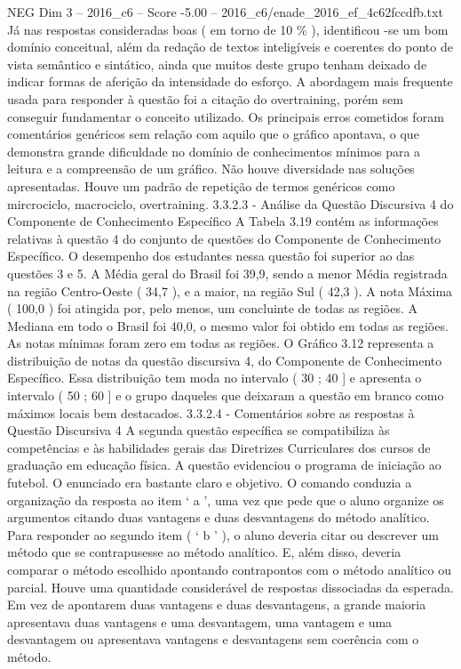 \begin{textsample}{NEG Dim 3 – 2016\_c6 – Score -5.00 – 2016\_c6/enade\_2016\_ef\_4c62fccdfb.txt}
Já nas respostas consideradas boas ( em torno de 10 \% ), identificou -se um bom domínio conceitual, além da redação de textos inteligíveis e coerentes do ponto de vista semântico e sintático, ainda que muitos deste grupo tenham deixado de indicar formas de aferição da intensidade do esforço.
A abordagem mais frequente usada para responder à questão foi a citação do overtraining, porém sem conseguir fundamentar o conceito utilizado.
Os principais erros cometidos foram comentários genéricos sem relação com aquilo que o gráfico apontava, o que demonstra grande dificuldade no domínio de conhecimentos mínimos para a leitura e a compreensão de um gráfico.
Não houve diversidade nas soluções apresentadas.
Houve um padrão de repetição de termos genéricos como mircrociclo, macrociclo, overtraining. 3.3.2.3 - Análise da Questão Discursiva 4 do Componente de Conhecimento Específico A Tabela 3.19 contém as informações relativas à questão 4 do conjunto de questões do Componente de Conhecimento Específico.
O desempenho dos estudantes nessa questão foi superior ao das questões 3 e 5.
A Média geral do Brasil foi 39,9, sendo a menor Média registrada na região Centro-Oeste ( 34,7 ), e a maior, na região Sul ( 42,3 ).
A nota Máxima ( 100,0 ) foi atingida por, pelo menos, um concluinte de todas as regiões.
A Mediana em todo o Brasil foi 40,0, o mesmo valor foi obtido em todas as regiões.
As notas mínimas foram zero em todas as regiões.
O Gráfico 3.12 representa a distribuição de notas da questão discursiva 4, do Componente de Conhecimento Específico.
Essa distribuição tem moda no intervalo ( 30 ; 40 ] e apresenta o intervalo ( 50 ; 60 ] e o grupo daqueles que deixaram a questão em branco como máximos locais bem destacados. 3.3.2.4 - Comentários sobre as respostas à Questão Discursiva 4 A segunda questão específica se compatibiliza às competências e às habilidades gerais das Diretrizes Curriculares dos cursos de graduação em educação física.
A questão evidenciou o programa de iniciação ao futebol.
O enunciado era bastante claro e objetivo.
O comando conduzia a organização da resposta ao item ‘ a ’, uma vez que pede que o aluno organize os argumentos citando duas vantagens e duas desvantagens do método analítico.
Para responder ao segundo item ( ‘ b ’ ), o aluno deveria citar ou descrever um método que se contrapusesse ao método analítico.
E, além disso, deveria comparar o método escolhido apontando contrapontos com o método analítico ou parcial.
Houve uma quantidade considerável de respostas dissociadas da esperada.
Em vez de apontarem duas vantagens e duas desvantagens, a grande maioria apresentava duas vantagens e uma desvantagem, uma vantagem e uma desvantagem ou apresentava vantagens e desvantagens sem coerência com o método.

\end{textsample}
